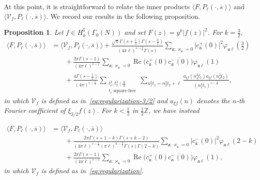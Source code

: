 \documentclass[11pt,reqno]{amsart}
\theoremstyle{plain}
\newtheorem{proposition}[theorem]{Proposition}
\theoremstyle{definition}
\numberwithin{equation}{section}
\renewcommand{\Re}{\operatorname{Re}}
\begin{document}
At this point, it is straightforward to relate the inner products $\langle F, P_\ell(\cdot , \overline{s}) \rangle$ and $\langle \mathcal{V}_f, P_\ell(\cdot, \overline{s}) \rangle$. We record our results in the following proposition.

\begin{proposition} \label{prop:F-regularization}
Let $f \in H_k^\sharp(\Gamma_0(N))$ and set $F(z) = y^k \vert f(z) \vert^2$. For $k=\frac{3}{2}$, 
\begin{align} \label{eq:regularization-inner-products-3/2}
	\langle F, P_\ell(\cdot, \overline{s}) \rangle 
	& = \langle \mathcal{V}_f, P_\ell(\cdot, \overline{s}) \rangle 
	+
		\frac{\sqrt{\pi}\Gamma(s+\frac{1}{2})\Gamma(s-\frac{3}{2})}
					{(4 \pi \ell)^{s-\frac{3}{2}} \Gamma(s)}
				\sum_{\mathfrak{a} : \varkappa_\mathfrak{a} = 0}
						\vert c_\mathfrak{a}^+(0) \vert^2 \varphi_{\mathfrak{a} \ell}(\tfrac{3}{2}) \\
	& \qquad +
	 \frac{2\pi \Gamma(s-1)}{(4\pi \ell)^{s-1}} \sum_{\mathfrak{a} : \varkappa_\mathfrak{a} = 0}
			\Re\big(c_\mathfrak{a}^+(0) \overline{c_\mathfrak{a}^-(0)}\big) \varphi_{\mathfrak{a} \ell}(1) \\
	& \qquad +
	\frac{4\Gamma(s-\frac{1}{2})}{(4\pi)^{s-\frac{1}{2}}} \!\!\!
		\sum_{\substack{t_1^3, t_2^3 \mid \frac{N}{4} \\ t_i \text{ square-free}}}
		\sum_{n_1^2 t_1 = n_2^2 t_2 + \ell} \!\!\!\!
			\frac{a_{\xi f}(n_1^2t_1)\overline{a_{\xi f}(n_2^2 t_2)}}{(n_1^2t_1)^{s-\frac{1}{2}}},
\end{align}
in which $\mathcal{V}_f$ is defined as in~\eqref{eq:regularization-3/2} and $a_{\xi f}(n)$ denotes the $n$-th Fourier coefficient of $\xi_{3/2} f(z)$. For $k < \frac{1}{2}$ in $\frac{1}{2}\mathbb{Z}$, we have instead

\begin{align} \label{eq:regularization-inner-products-general}
	\langle F, P_\ell(\cdot, \overline{s}) \rangle 
	& = \langle \mathcal{V}_f, P_\ell(\cdot, \overline{s}) \rangle  \\
	 & \qquad +
				\frac{2 \pi\Gamma(s+1-k)\Gamma(s+k-2)}
							{(4 \pi \ell)^{s-\frac{1}{2}} (\pi \ell)^{k-\frac{3}{2}}\Gamma(s)\Gamma(2-k)}
				\sum_{\mathfrak{a} : \varkappa_\mathfrak{a} = 0}
						\vert c_\mathfrak{a}^-(0) \vert^2 \varphi_{\mathfrak{a} \ell}(2-k) \\
	& \qquad +
	 \frac{2\pi \Gamma(s-1)}{(4\pi \ell)^{s-1}} \sum_{\mathfrak{a} : \varkappa_\mathfrak{a} = 0}
			\Re\big(c_\mathfrak{a}^+(0) \overline{c_\mathfrak{a}^-(0)}\big) \varphi_{\mathfrak{a} \ell}(1),
\end{align}
in which $\mathcal{V}_f$ is defined as in~\eqref{eq:regularization}. 
\end{proposition}
\end{document}
